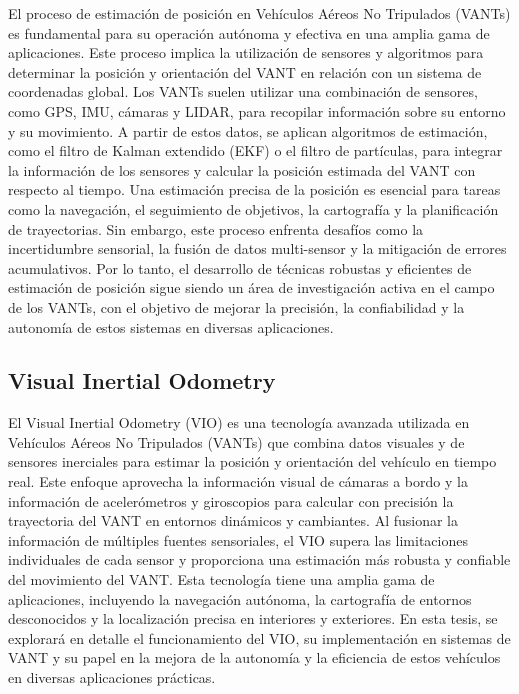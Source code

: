 El proceso de estimación de posición en Vehículos Aéreos No Tripulados (VANTs) es fundamental para su operación autónoma y efectiva en una amplia gama de aplicaciones. Este proceso implica la utilización de sensores y algoritmos para determinar la posición y orientación del VANT en relación con un sistema de coordenadas global. Los VANTs suelen utilizar una combinación de sensores, como GPS, IMU, cámaras y LIDAR, para recopilar información sobre su entorno y su movimiento. A partir de estos datos, se aplican algoritmos de estimación, como el filtro de Kalman extendido (EKF) o el filtro de partículas, para integrar la información de los sensores y calcular la posición estimada del VANT con respecto al tiempo. Una estimación precisa de la posición es esencial para tareas como la navegación, el seguimiento de objetivos, la cartografía y la planificación de trayectorias. Sin embargo, este proceso enfrenta desafíos como la incertidumbre sensorial, la fusión de datos multi-sensor y la mitigación de errores acumulativos. Por lo tanto, el desarrollo de técnicas robustas y eficientes de estimación de posición sigue siendo un área de investigación activa en el campo de los VANTs, con el objetivo de mejorar la precisión, la confiabilidad y la autonomía de estos sistemas en diversas aplicaciones.

\subsection{Visual Inertial Odometry}

El Visual Inertial Odometry (VIO) es una tecnología avanzada utilizada en Vehículos Aéreos No Tripulados (VANTs) que combina datos visuales y de sensores inerciales para estimar la posición y orientación del vehículo en tiempo real. Este enfoque aprovecha la información visual de cámaras a bordo y la información de acelerómetros y giroscopios para calcular con precisión la trayectoria del VANT en entornos dinámicos y cambiantes. Al fusionar la información de múltiples fuentes sensoriales, el VIO supera las limitaciones individuales de cada sensor y proporciona una estimación más robusta y confiable del movimiento del VANT. Esta tecnología tiene una amplia gama de aplicaciones, incluyendo la navegación autónoma, la cartografía de entornos desconocidos y la localización precisa en interiores y exteriores. En esta tesis, se explorará en detalle el funcionamiento del VIO, su implementación en sistemas de VANT y su papel en la mejora de la autonomía y la eficiencia de estos vehículos en diversas aplicaciones prácticas.


